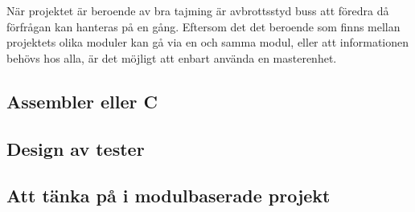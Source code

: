 \documentclass[11pt]{article}
\begin{document}
\begin{flushleft}
När projektet är beroende av bra tajming är avbrottsstyd buss att föredra då förfrågan kan hanteras på en gång. Eftersom det det beroende som finns mellan projektets olika moduler kan gå via en och samma modul, eller att informationen behövs hos alla, är det möjligt att enbart använda en masterenhet.

\subsection{Assembler eller C}

\subsection{Design av tester}

\subsection{Att tänka på i modulbaserade projekt}

\pagebreak
{}




\end{flushleft}
\end{document}
